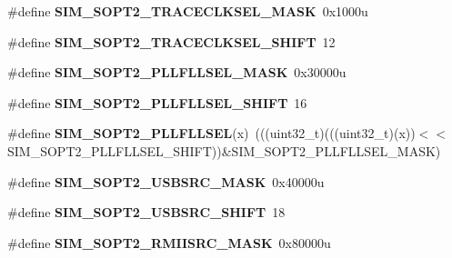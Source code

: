 \begin{DoxyCompactItemize}
\item 
\#define {\bfseries S\+I\+M\+\_\+\+S\+O\+P\+T2\+\_\+\+T\+R\+A\+C\+E\+C\+L\+K\+S\+E\+L\+\_\+\+M\+A\+SK}~0x1000u\hypertarget{group__SIM__Register__Masks_ga332894211abcda547cbf5d5093bd3f72}{}\label{group__SIM__Register__Masks_ga332894211abcda547cbf5d5093bd3f72}

\item 
\#define {\bfseries S\+I\+M\+\_\+\+S\+O\+P\+T2\+\_\+\+T\+R\+A\+C\+E\+C\+L\+K\+S\+E\+L\+\_\+\+S\+H\+I\+FT}~12\hypertarget{group__SIM__Register__Masks_ga6ce7d361b38ac28e6976c71569fe672b}{}\label{group__SIM__Register__Masks_ga6ce7d361b38ac28e6976c71569fe672b}

\item 
\#define {\bfseries S\+I\+M\+\_\+\+S\+O\+P\+T2\+\_\+\+P\+L\+L\+F\+L\+L\+S\+E\+L\+\_\+\+M\+A\+SK}~0x30000u\hypertarget{group__SIM__Register__Masks_gaa14141a225f9778babacbf3b90d0bae2}{}\label{group__SIM__Register__Masks_gaa14141a225f9778babacbf3b90d0bae2}

\item 
\#define {\bfseries S\+I\+M\+\_\+\+S\+O\+P\+T2\+\_\+\+P\+L\+L\+F\+L\+L\+S\+E\+L\+\_\+\+S\+H\+I\+FT}~16\hypertarget{group__SIM__Register__Masks_gae98b4d574b65472bdb294092d4ce5b4a}{}\label{group__SIM__Register__Masks_gae98b4d574b65472bdb294092d4ce5b4a}

\item 
\#define {\bfseries S\+I\+M\+\_\+\+S\+O\+P\+T2\+\_\+\+P\+L\+L\+F\+L\+L\+S\+EL}(x)~(((uint32\+\_\+t)(((uint32\+\_\+t)(x))$<$$<$S\+I\+M\+\_\+\+S\+O\+P\+T2\+\_\+\+P\+L\+L\+F\+L\+L\+S\+E\+L\+\_\+\+S\+H\+I\+FT))\&S\+I\+M\+\_\+\+S\+O\+P\+T2\+\_\+\+P\+L\+L\+F\+L\+L\+S\+E\+L\+\_\+\+M\+A\+SK)\hypertarget{group__SIM__Register__Masks_ga8d44d4d4557fe51bf7b212dd91af91ab}{}\label{group__SIM__Register__Masks_ga8d44d4d4557fe51bf7b212dd91af91ab}

\item 
\#define {\bfseries S\+I\+M\+\_\+\+S\+O\+P\+T2\+\_\+\+U\+S\+B\+S\+R\+C\+\_\+\+M\+A\+SK}~0x40000u\hypertarget{group__SIM__Register__Masks_ga1caf7ffe2555eb59ed410110b6aba463}{}\label{group__SIM__Register__Masks_ga1caf7ffe2555eb59ed410110b6aba463}

\item 
\#define {\bfseries S\+I\+M\+\_\+\+S\+O\+P\+T2\+\_\+\+U\+S\+B\+S\+R\+C\+\_\+\+S\+H\+I\+FT}~18\hypertarget{group__SIM__Register__Masks_ga2a455b7e86f26185c92961e139d13a89}{}\label{group__SIM__Register__Masks_ga2a455b7e86f26185c92961e139d13a89}

\item 
\#define {\bfseries S\+I\+M\+\_\+\+S\+O\+P\+T2\+\_\+\+R\+M\+I\+I\+S\+R\+C\+\_\+\+M\+A\+SK}~0x80000u\hypertarget{group__SIM__Register__Masks_ga9262e104be6bd6949b9c75eee32840da}{}\label{group__SIM__Register__Masks_ga9262e104be6bd6949b9c75eee32840da}


\end{DoxyCompactItemize}
